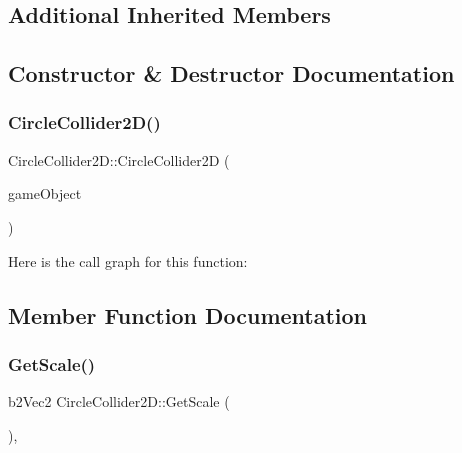 \subsection*{Additional Inherited Members}


\subsection{Constructor \& Destructor Documentation}
\hypertarget{class_mason_1_1_circle_collider2_d_ac713c4259ab552c74b291d0e17f0e98a}{}\label{class_mason_1_1_circle_collider2_d_ac713c4259ab552c74b291d0e17f0e98a} 
\subsubsection{\texorpdfstring{Circle\+Collider2\+D()}{CircleCollider2D()}}
{\footnotesize\ttfamily Circle\+Collider2\+D\+::\+Circle\+Collider2D (\begin{DoxyParamCaption}\item[{\hyperlink{class_mason_1_1_game_object}{Game\+Object} $\ast$}]{game\+Object }\end{DoxyParamCaption})\hspace{0.3cm}{\ttfamily [protected]}}

Here is the call graph for this function\+:


\subsection{Member Function Documentation}
\hypertarget{class_mason_1_1_circle_collider2_d_a4aa06f3ff8f00445a78f6b6a8b479ad0}{}\label{class_mason_1_1_circle_collider2_d_a4aa06f3ff8f00445a78f6b6a8b479ad0} 
\subsubsection{\texorpdfstring{Get\+Scale()}{GetScale()}}
{\footnotesize\ttfamily b2\+Vec2 Circle\+Collider2\+D\+::\+Get\+Scale (\begin{DoxyParamCaption}{ }\end{DoxyParamCaption})\hspace{0.3cm}{\ttfamily [override]}, {\ttfamily [virtual]}}



